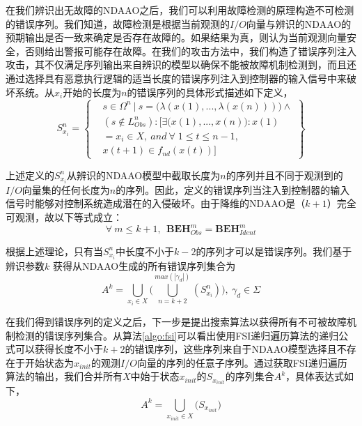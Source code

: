 在我们辨识出无故障的NDAAO之后，我们可以利用故障检测的原理构造不可检测的错误序列。我们知道，故障检测是根据当前观测的$I/O$向量与辨识的NDAAO的预期输出是否一致来确定是否存在故障的。如果结果为真，则认为当前观测向量安全，否则给出警报可能存在故障。在我们的攻击方法中，我们构造了错误序列注入攻击，其不仅满足序列输出来自辨识的模型以确保不能被故障机制检测到，而且还通过选择具有恶意执行逻辑的适当长度的错误序列注入到控制器的输入信号中来破坏系统。从$ x_i $开始的长度为$ n $的错误序列的具体形式描述如下定义，
\begin{equation} 
S_{x_i}^{n}=\left\{\begin{split} &s\in \Omega^n~|~s=\big( \lambda(x(1),...,\lambda(x(n))) \big)\wedge\\
&(s\notin L_{Obs}^n):[\exists \big(x(1),...,x(n)\big): x(1)\\&=x_i\in X,~and~
\forall\;1\leq t\leq n-1,\\&x(t+1)\in f_{nd}(x(t))] \end{split} \right\} 
\end{equation}

上述定义的$ S_{x_i}^{n} $从辨识的NDAAO模型中截取长度为$ n $的序列并且不同于观测到的$I/O$向量集的任何长度为$ n $的序列。因此，定义的错误序列当注入到控制器的输入信号时能够对控制系统造成潜在的入侵破坏。由于降维的NDAAO是$（k + 1）$完全可观测，故以下等式成立：
\begin{equation} 
\forall~m\leq k+1,~~\textbf{BEH}_{Obs}^m=\textbf{BEH}_{Ident}^m 
\end{equation}

根据上述理论，只有当$ S_ {x_i} ^ {n} $中长度不小于$ k-2 $的序列才可以是错误序列。我们基于辨识参数$ k $ 获得从NDAAO生成的所有错误序列集合为
\begin{equation} 
A^k=\bigcup_{x_i\in X} \big( \bigcup_{n=k+2}^{max(|\gamma_d|)} (S_{x_i}^{n})\big),~\gamma_d\in \Sigma \end{equation}

在我们得到错误序列的定义之后，下一步是提出搜索算法以获得所有不可被故障机制检测的错误序列集合。从算法\ref{algo:fsi}可以看出使用FSI递归遍历算法的递归公式可以获得长度不小于$ k + 2 $的错误序列，这些序列来自于NDAAO模型选择且不存在于开始状态为$ x_ {init} $的观测$I/O$向量的序列的任意子序列。通过获取FSI递归遍历算法的输出，我们合并所有$ X $中始于状态$ x_ {init} $的$ S_ {x_ {init}} $的序列集合$ A ^ k $，具体表达式如下，
\begin{equation} 
A^k=\bigcup_{x_{init}\in X} \big(S_{x_{init}}\big) 
\end{equation}

